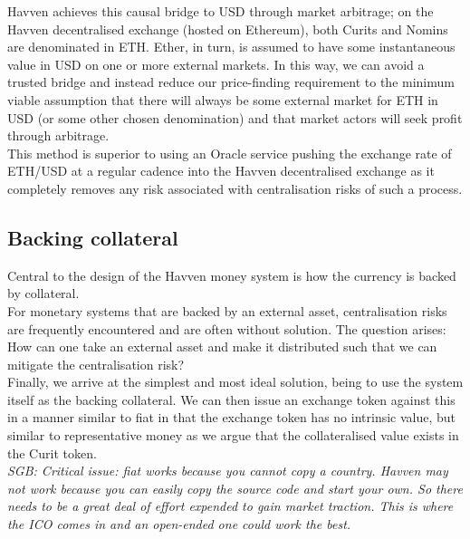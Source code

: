 \documentclass{article}
\begin{document}
\noindent Havven achieves this causal bridge to USD through market arbitrage; on the Havven decentralised exchange (hosted on Ethereum), both Curits and Nomins are denominated in ETH. Ether, in turn, is assumed to have some instantaneous value in USD on one or more external markets. In this way, we can avoid a trusted bridge and instead reduce our price-finding requirement to the minimum viable assumption that there will always be some external market for ETH in USD (or some other chosen denomination) and that market actors will seek profit through arbitrage. \\

\noindent This method is superior to using an Oracle service pushing the exchange rate of ETH/USD at a regular cadence into the Havven decentralised exchange as it completely removes any risk associated with centralisation risks of such a process. \\

\subsection{Backing collateral}

Central to the design of the Havven money system is how the currency is backed by collateral. \\

\noindent For monetary systems that are backed by an external asset, centralisation risks are frequently encountered and are often without solution. The question arises: \\

\noindent How can one take an external asset and make it distributed such that we can mitigate the centralisation risk? \\

\noindent Finally, we arrive at the simplest and most ideal solution, being to use the system itself as the backing collateral. We can then issue an exchange token against this in a manner similar to fiat in that the exchange token has no intrinsic value, but similar to representative money as we argue that the collateralised value exists in the Curit token. \\

\noindent \textit{SGB: Critical issue: fiat works because you cannot copy a country. Havven may not work because you can easily copy the source code and start your own. So there needs to be a great deal of effort expended to gain market traction. This is where the ICO comes in and an open-ended one could work the best.} \\
\end{document}
